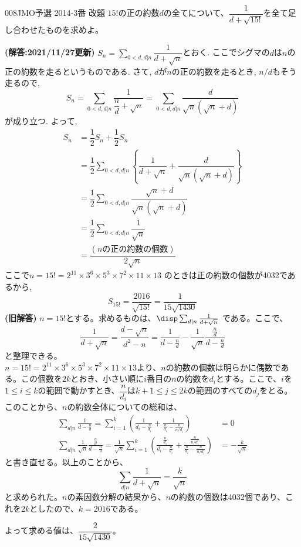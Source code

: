 \begin{prob}{008}{}{JMO予選 2014-3番 改題}
 $15!$の正の約数$d$の全てについて、$\dfrac{1}{d+\sqrt{15!}}$を全て足し合わせたものを求めよ。
\end{prob}
\textbf{(解答:2021/11/27更新)} 
$S_n = \sum_{0<d, d|n}\dfrac{1}{d+\sqrt{n}}$とおく. ここでシグマの$d$は$n$の正の約数を走るというものである. さて, $d$が$n$の正の約数を走るとき, $n/d$もそう走るので, 
\[S_n = \sum_{0<d, d|n} \dfrac{1}{\dfrac{n}{d} + \sqrt{n}} = \sum_{0<d, d|n} \dfrac{d}{\sqrt{n}(\sqrt{n}+d)} \]
が成り立つ. よって, 
\begin{align*}
S_n &= \dfrac{1}{2}S_n + \dfrac{1}{2} S_n \\
&= \dfrac{1}{2}\sum_{0<d, d|n} \left\{ \dfrac{1}{d+\sqrt{n}} + \dfrac{d}{\sqrt{n}(\sqrt{n} + d)} \right\} \\
&= \dfrac{1}{2}\sum_{0<d, d|n} \dfrac{\sqrt{n} + d}{\sqrt{n}(\sqrt{n} + d)}\\
&= \dfrac{1}{2}\sum_{0<d, d|n} \dfrac{1}{\sqrt{n}} \\
&= \dfrac{(nの正の約数の個数)}{2\sqrt{n}}
\end{align*}
ここで$n=15! = 2^11\times 3^6\times 5^3 \times 7^2\times 11\times 13$ のときは正の約数の個数が4032であるから, 
\[S_{15!} = \dfrac{2016}{\sqrt{15!}} = \dfrac{1}{15\sqrt{1430}}\]
\textbf{(旧解答)}
$n=15!$とする。求めるものは、$\disp \sum_{d|n}\frac{1}{d+\sqrt{n}}$ である。ここで、
\[ \frac{1}{d+\sqrt{n}} = \frac{d-\sqrt{n}}{d^2-n} = \frac{1}{d-\frac{n}{d}}-\frac{1}{\sqrt{n}}\frac{\frac{n}{d}}{d-\frac{n}{d}} \]
と整理できる。\\
$n=15!=2^{11}\times 3^6\times 5^3\times 7^2\times 11\times 13$より、$n$の約数の個数は明らかに偶数である。この個数を$2k$とおき、小さい順に$i$番目の$n$の約数を$d_i$とする。ここで、$i$を$1\le i \le k$の範囲で動かすとき、$\dfrac{n}{d_i}$は$k+1\le j \le 2k$の範囲のすべての$d_j$をとる。このことから、$n$の約数全体についての総和は、
\begin{align*}
 \sum_{d|n} \frac{1}{d-\frac{n}{d}}=\sum_{i=1}^k \left(\frac{1}{d_i-\frac{n}{d_i}}+\frac{1}{\frac{n}{d_i}-\frac{n}{n/d_i}}\right) &= 0 \\
 \sum_{d|n} \frac{1}{\sqrt{n}}\frac{\frac{n}{d}}{d-\frac{n}{d}} = \frac{1}{\sqrt{n}} \sum_{i=1}^k \left(\frac{\frac{n}{d_i}}{d_i-\frac{n}{d_i}} + \frac{\frac{n}{n/d_i}}{\frac{n}{d_i}-\frac{n}{n/d_i}}\right) &= -\frac{k}{\sqrt{n}} 
\end{align*}
と書き直せる。以上のことから、
\[ \sum_{d|n}\frac{1}{d+\sqrt{n}} = \frac{k}{\sqrt{n}} \]
と求められた。$n$の素因数分解の結果から、$n$の約数の個数は4032個であり、これを$2k$としたので、$k=2016$である。

よって求める値は、\textbf{$\dfrac{2}{15\sqrt{1430}}$}。